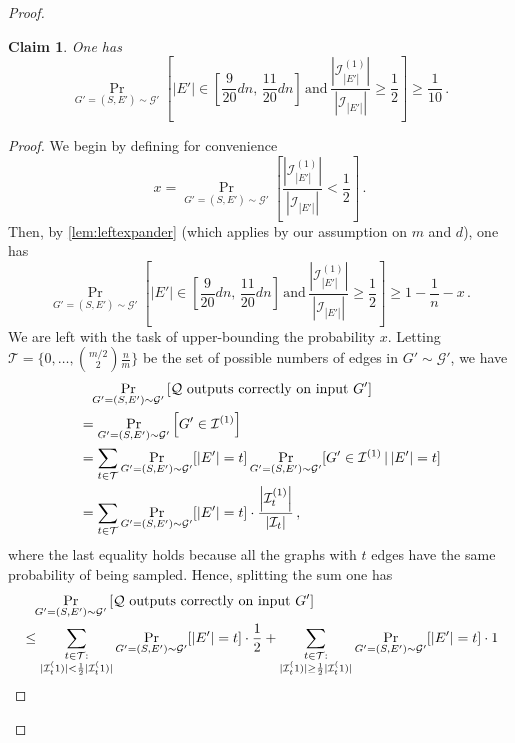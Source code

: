 \documentclass[epsfig,letter,11pt]{article}
\numberwithin{equation}{section}
\newcommand{\I}{\mathcal{I}}
\newcommand{\T}{\mathcal{T}}
\newtheorem{claim}[theorem]{Claim}
\begin{document}
\begin{proof}
	\begin{claim}
		\label{claim:conditionlargeprob}
		One has
		\begin{equation*}
			\Pr_{G'=(S,E') \sim \mathcal{G}'}\left[  |E'| \in \left[\frac{9}{20}dn , \, \frac{11}{20}dn\right]  \, \mathrm{ and } \, \frac{\left|\I_{|E'|}^{(1)}\right|}{\left|\I_{|E'| }\right|} \ge  \frac{1}{2}\right] \ge \frac{1}{10} \, .
		\end{equation*}
	\end{claim}
	\begin{proof}
		We begin by defining for convenience
		\begin{equation*}
			x  = \Pr_{G'=(S,E') \sim \mathcal{G}'}\left[  \frac{\left|\I_{|E'|}^{(1)}\right|}{\left|\I_{|E'| }\right|} < \frac{1}{2}\right]  \, .
		\end{equation*}
		Then, by \cref{lem:leftexpander} (which applies by our assumption on $m$ and $d$), one has
		 \begin{equation}
		 	\label{eq:unionbound}
		 		\Pr_{G'=(S,E') \sim \mathcal{G}'}\left[  |E'| \in \left[\frac{9}{20}dn , \, \frac{11}{20}dn\right]  \, \mathrm{ and } \, \frac{\left|\I_{|E'|}^{(1)}\right|}{\left|\I_{|E'| }\right|} \ge  \frac{1}{2}\right]  \ge 1-\frac{1}{n} - x\, .
		 \end{equation}
		 We are left with the task of upper-bounding the probability $x$. Letting $\T = \{0, \dots, \binom{m/2}{2} \frac{n}{m}\}$ be  the set of possible numbers of edges in $G' \sim \mathcal{G}'$, we have
		 \begin{align*}
		 	& \hphantom{=} \Pr_{G'=(S,E') \sim \mathcal{G}'}\left[\mathcal{Q} \text{ outputs correctly on input } G'\right]\\
		 	& = \Pr_{G'=(S,E') \sim \mathcal{G}'}\left[G' \in \I^{(1)}\right] \\
		 	& =\sum_{t \in \T} \Pr_{G'=(S,E') \sim \mathcal{G}'}[|E'|=t] \Pr_{G'=(S,E') \sim \mathcal{G}'}[G' \in \I^{(1)} \, | \, |E'|=t] \\
		 	& = \sum_{t \in \T}\Pr_{G'=(S,E') \sim \mathcal{G}'}[|E'|=t]  \cdot \frac{\left|\I_{t}^{(1)}\right|}{\left|\I_{t}\right|} \, ,
		\end{align*}
		where the last equality holds because all the graphs with $t$  edges have the same probability of being sampled. Hence, splitting the sum one has
		\begin{align*}
			& \hphantom{=} \Pr_{G'=(S,E') \sim \mathcal{G}'}\left[\mathcal{Q} \text{ outputs correctly on input } G'\right]\\
		 	& \le \sum_{\substack{t \in \T : \\ |\I_t^(1)| < \frac{1}{2}|\I_t^(1)| }}  \Pr_{G'=(S,E') \sim \mathcal{G}'}[|E'|=t] \cdot \frac{1}{2} + \sum_{\substack{t \in \T : \\ |\I_t^(1)| \ge \frac{1}{2}|\I_t^(1)| }} \Pr_{G'=(S,E') \sim \mathcal{G}'}[|E'|=t]\cdot 1\\

\end{align*}
\end{proof}
\end{proof}
\end{document}
